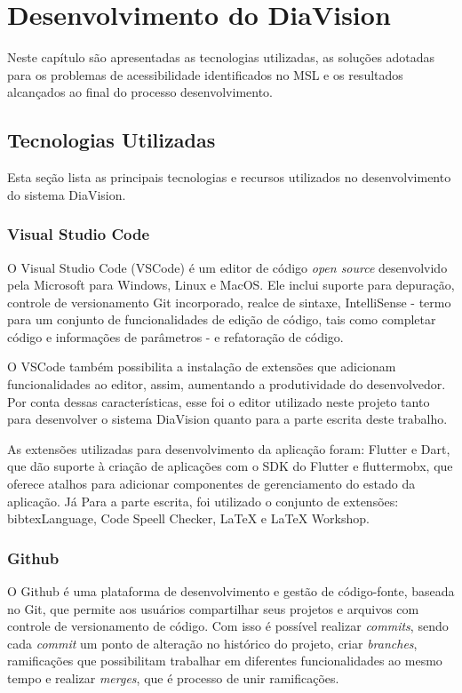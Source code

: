 \chapter{Desenvolvimento do DiaVision}
\label{ch:development}

Neste capítulo são apresentadas as tecnologias utilizadas, as soluções adotadas para os problemas
de acessibilidade identificados no MSL e os resultados alcançados ao final do processo desenvolvimento.

\section{Tecnologias Utilizadas}

Esta seção lista as principais tecnologias e recursos utilizados no desenvolvimento do sistema DiaVision.

\subsection{Visual Studio Code}

O Visual Studio Code (VSCode) é um editor de código \emph{open source} desenvolvido pela Microsoft para Windows, Linux e MacOS.
Ele inclui suporte para depuração, controle de versionamento Git incorporado, realce de sintaxe, IntelliSense
- termo para um conjunto de funcionalidades de edição de código, tais como completar código e informações de parâmetros -
e refatoração de código.

O VSCode também possibilita a instalação de extensões que adicionam funcionalidades ao editor, assim, aumentando a produtividade do desenvolvedor.
Por conta dessas características, esse foi o editor utilizado neste projeto tanto para desenvolver o sistema DiaVision quanto para a parte escrita deste trabalho.

As extensões utilizadas para desenvolvimento da aplicação foram: Flutter e Dart, que dão suporte à criação de aplicações com o SDK do Flutter
e fluttermobx, que oferece atalhos para adicionar componentes de gerenciamento do estado da aplicação. Já Para a parte escrita,
foi utilizado o conjunto de extensões: bibtexLanguage, Code Speell Checker, LaTeX e LaTeX Workshop.

\newpage

\subsection{Github}

O Github é uma plataforma de desenvolvimento e gestão de código-fonte, baseada no Git, que permite aos usuários compartilhar seus projetos e arquivos com controle
de versionamento de código. Com isso é possível realizar \emph{commits}, sendo cada \emph{commit} um ponto de alteração no histórico do
projeto, criar \emph{branches}, ramificações que possibilitam trabalhar em diferentes funcionalidades ao mesmo tempo e realizar \emph{merges},
que é processo de unir ramificações.

